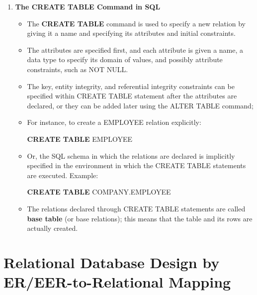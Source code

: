 \documentclass[10pt]{article}
\begin{document}
\begin{enumerate}
	\item \textbf{The CREATE TABLE Command in SQL}
	\begin{itemize}
		\item The \textbf{CREATE TABLE} command is used to specify a new relation by giving it a name and specifying its attributes and initial constraints.
		\item The attributes are specified first, and each attribute is given a name, a data type to specify its domain of values, and possibly attribute constraints, such as NOT NULL.
		\item The key, entity integrity, and referential integrity constraints can be specified within CREATE TABLE statement after the attributes are declared, or they can be added later using the ALTER TABLE command;
		\item For instance, to create a EMPLOYEE relation explicitly:
		\begin{center}
			\textbf{CREATE TABLE} EMPLOYEE
		\end{center}
		\item Or, the SQL schema in which the relations are declared is implicitly specified in the environment in which the CREATE TABLE statements are executed. Example:
		\begin{center}
			\textbf{CREATE TABLE} COMPANY.EMPLOYEE
		\end{center}
		\item The relations declared through CREATE TABLE statements are called \textbf{base table} (or base relations); this means that the table and its rows are actually created.
	\end{itemize}
\end{enumerate}

\pagebreak
\section*{Relational Database Design by ER/EER-to-Relational Mapping}
\end{document}
